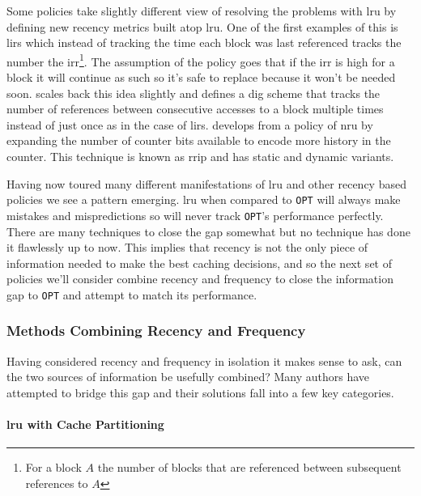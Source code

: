 Some policies take slightly different view of resolving the problems with \gls{lru} by defining new recency metrics built atop \gls{lru}. One of the first examples of this is \gls{lirs}\cite{jiangLIRSEfficientLow2002} which instead of tracking the time each block was last referenced tracks the number the \gls{irr}\footnote{For a block $A$ the number of blocks that are referenced between subsequent references to $A$}. The assumption of the policy goes that if the \gls{irr} is high for a block it will continue as such so it's safe to replace because it won't be needed soon. \citet{chooDIGDegreeInterreference2006} scales back this idea slightly and defines a \gls{dig} scheme that tracks the number of references between consecutive accesses to a block multiple times instead of just once as in the case of \gls{lirs}. \citet{jaleelHighPerformanceCache2010} develops from a policy of \gls{nru} by expanding the number of counter bits available to encode more history in the counter. This technique is known as \gls{rrip} and has static and dynamic variants. 

Having now toured many different manifestations of \gls{lru} and other recency based policies we see a pattern emerging. \gls{lru} when compared to \texttt{OPT} will always make mistakes and mispredictions so will never track \texttt{OPT}'s performance perfectly. There are many techniques to close the gap somewhat but no technique has done it flawlessly up to now. This implies that recency is not the only piece of information needed to make the best caching decisions, and so the next set of policies we'll consider combine recency and frequency to close the information gap to \texttt{OPT} and attempt to match its performance.

\subsubsection{Methods Combining Recency and Frequency}

Having considered recency and frequency in isolation it makes sense to ask, can the two sources of information be usefully combined? Many authors have attempted to bridge this gap and their solutions fall into a few key categories. 

\paragraph{\gls{lru} with Cache Partitioning}

